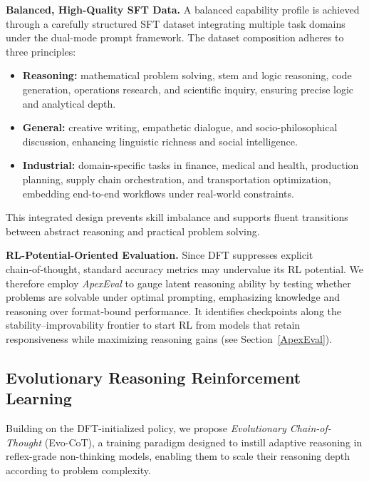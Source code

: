 \documentclass[table]{gtech}
\theoremstyle{definition}
\begin{document}
\textbf{Balanced, High-Quality SFT Data.}
A balanced capability profile is achieved through a carefully structured SFT dataset integrating multiple task domains under the dual-mode prompt framework. The dataset composition adheres to three principles:
\begin{itemize}
\item \textbf{Reasoning:} mathematical problem solving, stem and logic reasoning, code generation, operations research, and scientific inquiry, ensuring precise logic and analytical depth.
\item \textbf{General:} creative writing, empathetic dialogue, and socio-philosophical discussion, enhancing linguistic richness and social intelligence.
\item \textbf{Industrial:} domain-specific tasks in finance, medical and health, production planning, supply chain orchestration, and transportation optimization, embedding end-to-end workflows under real-world constraints.
\end{itemize}
This integrated design prevents skill imbalance and supports fluent transitions between abstract reasoning and practical problem solving.

\textbf{RL-Potential-Oriented Evaluation.}
Since DFT suppresses explicit chain‑of‑thought, standard accuracy metrics may undervalue its RL potential. We therefore employ \emph{ApexEval} to gauge latent reasoning ability by testing whether problems are solvable under optimal prompting, emphasizing knowledge and reasoning over format‑bound performance. It identifies checkpoints along the stability–improvability frontier to start RL from models that retain responsiveness while maximizing reasoning gains (see Section~\ref{ApexEval}).

\subsection{Evolutionary Reasoning Reinforcement Learning}
\label{ERL}

Building on the DFT-initialized policy, we propose \emph{Evolutionary Chain-of-Thought} (Evo-CoT), a training paradigm designed to instill adaptive reasoning in reflex-grade non-thinking models, enabling them to scale their reasoning depth according to problem complexity.
\end{document}
